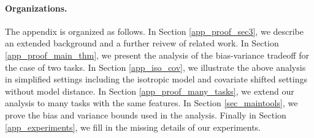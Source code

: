 \paragraph{Organizations.}
The appendix is organized as follows.
In Section \ref{app_proof_sec3}, we describe an extended background and a further reivew of related work.
In Section \ref{app_proof_main_thm}, we present the analysis of the bias-variance tradeoff for the case of two tasks.
In Section \ref{app_iso_cov}, we illustrate the above analysis in simplified settings including the isotropic model and covariate shifted settings without model distance.
In Section \ref{app_proof_many_tasks}, we extend our analysis to many tasks with the same features.
In Section \ref{sec_maintools}, we prove the bias and variance bounds used in the analysis.
Finally in Section \ref{app_experiments}, we fill in the missing details of our experiments.

